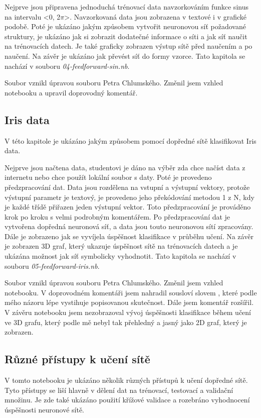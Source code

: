 \documentclass[11pt,twoside,a4paper]{book}
\begin{document}
Nejprve jsou připravena jednoduchá trénovací data navzorkováním funkce sinus na intervalu <0, 2\begin{math}\pi \end{math}>. Navzorkovaná data jsou zobrazena v textové i v grafické podobě. Poté je ukázáno jakým způsobem vytvořit neuronovou síť požadované struktury, je ukázáno jak si zobrazit dodatečné informace o síti a jak síť naučit na trénovacích datech. Je také graficky zobrazen výstup sítě před naučením a po naučení. Na závěr je ukázáno jak převést síť do formy vzorce. Tato kapitola se nachází v souboru \textit{04-feedforward-sin.nb}.

Soubor vznikl úpravou souboru Petra Chlumského. Změnil jsem vzhled notebooku a upravil doprovodný komentář.
\subsection{Iris data}
V této kapitole je ukázáno jakým způsobem pomocí dopředné sítě klasifikovat Iris data.

Nejprve jsou načtena data, studentovi je dáno na výběr zda chce načíst data z internetu nebo chce použít lokální soubor s daty. Poté je provedeno předzpracování dat. Data jsou rozdělena na vstupní a výstupní vektory, protože výstupní parametr je textový, je provedeno jeho překódování metodou 1 z N, kdy je každé třídě přiřazen jeden výstupní vektor. Toto předzpracování je prováděno krok po kroku s velmi podrobným komentářem. Po předzpracování dat je vytvořena dopředná neuronová síť, a data jsou touto neuronovou sítí zpracovány. Dále je zobrazeno jak se vyvíjela úspěšnost klasifikace v průběhu učení. Na závěr je zobrazen 3D graf, který ukazuje úspěšnost sítě na trénovacích datech a je ukázána možnost jak síť symbolicky vyhodnotit. Tato kapitola se nachází v souboru \textit{05-feedforward-iris.nb}.

Soubor vznikl úpravou souboru Petra Chlumského. Změnil jsem vzhled notebooku. V doprovodném komentáři jsem nahradil sousloví  slovem , které podle mého názoru lépe vystihuje popisovanou skutečnost. Dále jsem komentář rozšířil. V závěru notebooku jsem nezobrazoval vývoj úspěšnosti klasifikace během učení ve 3D grafu, který podle mě nebyl tak přehledný a jasný jako 2D graf, který je zobrazen.
\subsection{Různé přístupy k učení sítě}
V tomto notebooku je ukázáno několik různých přístupů k učení dopředné sítě. Tyto přístupy se liší hlavně v dělení dat na trénovací, testovací a validační množinu. Je zde také ukázáno použití křížové validace a rozebráno vyhodnocení úspěšnosti neuronové sítě.
\end{document}
